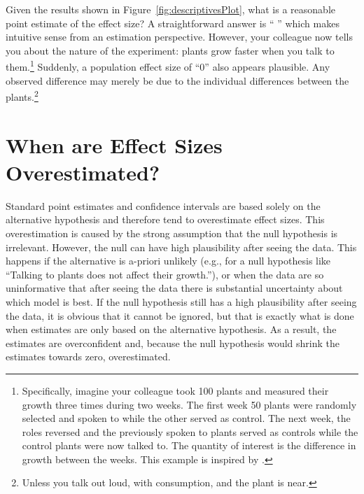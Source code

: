 \documentclass[a4paper]{article}
\newcommand{\getValue}[3]{%
	\pgfplotstablegetelem{#1}{#2}\of{#3}%
	\pgfmathprintnumber{\pgfplotsretval}%
}
\begin{document}
Given the results shown in Figure~\ref{fig:descriptivesPlot}, what is a reasonable point estimate of the effect size? A straightforward answer is ``\getValue{0}{Estimate}{\tbEffectSizeExample}'' which makes intuitive sense from an estimation perspective. However, your colleague now tells you about the nature of the experiment: plants grow faster when you talk to them.\footnote{Specifically, imagine your colleague took 100 plants and measured their growth three times during two weeks. The first week 50 plants were randomly selected and spoken to while the other served as control. The next week, the roles reversed and the previously spoken to plants served as controls while the control plants were now talked to. The quantity of interest is the difference in growth between the weeks. This example is inspired by \protect{}.} Suddenly, a population effect size of ``0'' also appears plausible. Any observed difference may merely be due to the individual differences between the plants.\footnote{Unless you talk out loud, with consumption, and the plant is near.}

\section*{When are Effect Sizes Overestimated?}
Standard point estimates and confidence intervals are based solely on the alternative hypothesis and therefore tend to overestimate effect sizes. This overestimation is caused by the strong assumption that the null hypothesis is irrelevant. However, the null can have high plausibility after seeing the data. This happens if the alternative is a-priori unlikely (e.g., for a null hypothesis like ``Talking to plants does not affect their growth.''), or when the data are so uninformative that after seeing the data there is substantial uncertainty about which model is best. If the null hypothesis still has a high plausibility after seeing the data, it is obvious that it cannot be ignored, but that is exactly what is done when estimates are only based on the alternative hypothesis. As a result, the estimates are overconfident and, because the null hypothesis would shrink the estimates towards zero, overestimated.
\end{document}
